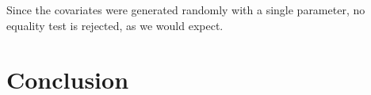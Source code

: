 \documentclass[english,nojss]{jss}\usepackage{graphicx, color}
\begin{document}
Since the covariates were generated randomly with a single parameter,
no equality test is rejected, as we would expect. 


\section{Conclusion}


\end{document}
